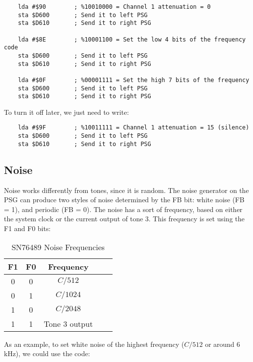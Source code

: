\begin{verbatim}
    lda #$90        ; %10010000 = Channel 1 attenuation = 0
    sta $D600       ; Send it to left PSG
    sta $D610       ; Send it to right PSG

    lda #$8E        ; %10001100 = Set the low 4 bits of the frequency code
    sta $D600       ; Send it to left PSG
    sta $D610       ; Send it to right PSG

    lda #$0F        ; %00001111 = Set the high 7 bits of the frequency
    sta $D600       ; Send it to left PSG
    sta $D610       ; Send it to right PSG
\end{verbatim}
To turn it off later, we just need to write:

\begin{verbatim}
    lda #$9F        ; %10011111 = Channel 1 attenuation = 15 (silence)
    sta $D600       ; Send it to left PSG
    sta $D610       ; Send it to right PSG
\end{verbatim}

\subsection*{Noise}

Noise works differently from tones, since it is random. The noise generator on the PSG can produce two styles of noise determined by the FB bit: white noise (FB = 1), and periodic (FB = 0). The noise has a sort of frequency, based on either the system clock or the current output of tone 3. This frequency is set using the F1 and F0 bits:

\begin{table}[ht]
	\begin{center}
		\begin{tabular}{|c|c|c|c|l|} \hline
			F1 & F0 & Frequency \\ \hline \hline
			0 & 0 & $C / 512$ \\ \hline
			0 & 1 & $C / 1024$ \\ \hline
			1 & 0 & $C / 2048$ \\ \hline
			1 & 1 & Tone 3 output \\ \hline
		\end{tabular}
		\caption{SN76489 Noise Frequencies}
	\end{center}
	\label{tab:psg_noise_freq}
\end{table}

As an example, to set white noise of the highest frequency ($C / 512$ or around 6 kHz), we could use the code:

